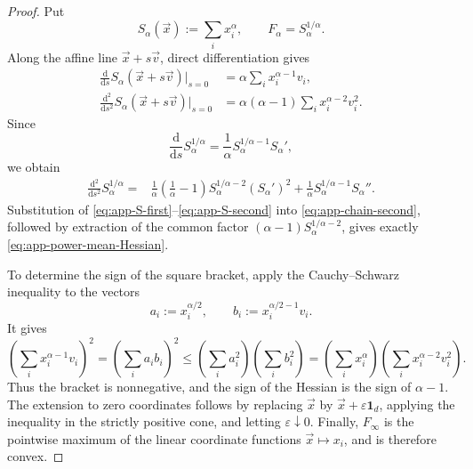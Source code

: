 \documentclass[aps,pra,11pt,onecolumn,nofootinbib,tightenlines]{revtex4-2}
\theoremstyle{definition}
\begin{document}
\begin{proof}
Put
\begin{equation}
 S_\alpha(\vec x):=\sum_i x_i^\alpha,
 \qquad
 F_\alpha=S_\alpha^{1/\alpha}.
 \label{eq:app-S-alpha}
\end{equation}
Along the affine line $\vec x+s\vec v$, direct differentiation gives
\begin{align}
 \frac{\mathrm d}{\mathrm ds}S_\alpha(\vec x+s\vec v)\bigg|_{s=0}
 &=\alpha\sum_i x_i^{\alpha-1}v_i,
 \label{eq:app-S-first}\\
 \frac{\mathrm d^2}{\mathrm ds^2}S_\alpha(\vec x+s\vec v)\bigg|_{s=0}
 &=\alpha(\alpha-1)\sum_i x_i^{\alpha-2}v_i^2.
 \label{eq:app-S-second}
\end{align}
Since
\begin{equation}
 \frac{\mathrm d}{\mathrm ds}S_\alpha^{1/\alpha}
 =\frac1\alpha S_\alpha^{1/\alpha-1}S_\alpha',
 \label{eq:app-chain-first}
\end{equation}
we obtain
\begin{align}
 \frac{\mathrm d^2}{\mathrm ds^2}S_\alpha^{1/\alpha}
 ={}&\frac1\alpha\left(\frac1\alpha-1\right)
 S_\alpha^{1/\alpha-2}(S_\alpha')^2
 +\frac1\alpha S_\alpha^{1/\alpha-1}S_\alpha''.
 \label{eq:app-chain-second}
\end{align}
Substitution of \eqref{eq:app-S-first}--\eqref{eq:app-S-second} into \eqref{eq:app-chain-second}, followed by extraction of the common factor $(\alpha-1)S_\alpha^{1/\alpha-2}$, gives exactly \eqref{eq:app-power-mean-Hessian}.

To determine the sign of the square bracket, apply the Cauchy--Schwarz inequality to the vectors
\begin{equation}
 a_i:=x_i^{\alpha/2},
 \qquad
 b_i:=x_i^{\alpha/2-1}v_i.
 \label{eq:app-CS-vectors}
\end{equation}
It gives
\begin{equation}
 \left(\sum_i x_i^{\alpha-1}v_i\right)^2
 =\left(\sum_i a_ib_i\right)^2
 \leq
 \left(\sum_i a_i^2\right)
 \left(\sum_i b_i^2\right)
 =\left(\sum_i x_i^\alpha\right)
  \left(\sum_i x_i^{\alpha-2}v_i^2\right).
 \label{eq:app-power-CS}
\end{equation}
Thus the bracket is nonnegative, and the sign of the Hessian is the sign of $\alpha-1$.  The extension to zero coordinates follows by replacing $\vec x$ by $\vec x+\varepsilon\mathbf1_d$, applying the inequality in the strictly positive cone, and letting $\varepsilon\downarrow0$.  Finally, $F_\infty$ is the pointwise maximum of the linear coordinate functions $\vec x\mapsto x_i$, and is therefore convex.
\end{proof}
\end{document}
